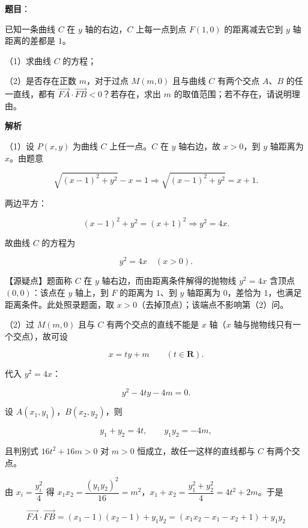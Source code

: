 \begin{answer}

\textbf{题目}：

已知一条曲线 $C$ 在 $y$ 轴的右边，$C$ 上每一点到点 $F(1,0)$ 的距离减去它到 $y$ 轴距离的差都是 $1$。

（1）求曲线 $C$ 的方程；

（2）是否存在正数 $m$，对于过点 $M(m,0)$ 且与曲线 $C$ 有两个交点 $A$、$B$ 的任一直线，都有 $\overrightarrow{FA}\cdot\overrightarrow{FB}<0$？若存在，求出 $m$ 的取值范围；若不存在，请说明理由。

\textbf{解析}

（1）设 $P(x,y)$ 为曲线 $C$ 上任一点。$C$ 在 $y$ 轴右边，故 $x>0$，到 $y$ 轴距离为 $x$。由题意

\nopagebreak[4]
\[\sqrt{(x-1)^2+y^2}-x=1
\Longrightarrow \sqrt{(x-1)^2+y^2}=x+1.\]

两边平方：

\nopagebreak[4]
\[(x-1)^2+y^2=(x+1)^2\Longrightarrow y^2=4x.\]

故曲线 $C$ 的方程为

\nopagebreak[4]
\[y^2=4x\quad(x>0).\]

【源疑点】题面称 $C$ 在 $y$ 轴右边，而由距离条件解得的抛物线 $y^2=4x$ 含顶点 $(0,0)$：该点在 $y$ 轴上，到 $F$ 的距离为 $1$、到 $y$ 轴距离为 $0$，差恰为 $1$，也满足距离条件。此处照录题面，取 $x>0$（去掉顶点）；该端点不影响第（2）问。

（2）过 $M(m,0)$ 且与 $C$ 有两个交点的直线不能是 $x$ 轴（$x$ 轴与抛物线只有一个交点），故可设

\nopagebreak[4]
\[x=ty+m\qquad(t\in\mathbf R).\]

代入 $y^2=4x$：

\nopagebreak[4]
\[y^2-4ty-4m=0.\]

设 $A(x_1,y_1)$，$B(x_2,y_2)$，则

\nopagebreak[4]
\[y_1+y_2=4t,\qquad y_1y_2=-4m,\]

且判别式 $16t^2+16m>0$ 对 $m>0$ 恒成立，故任一这样的直线都与 $C$ 有两个交点。

由 $x_i=\dfrac{y_i^2}{4}$ 得 $x_1x_2=\dfrac{(y_1y_2)^2}{16}=m^2$，$x_1+x_2=\dfrac{y_1^2+y_2^2}{4}=4t^2+2m$。于是

\nopagebreak[4]
\[\overrightarrow{FA}\cdot\overrightarrow{FB}=(x_1-1)(x_2-1)+y_1y_2
=\left(x_1x_2-x_1-x_2+1\right)+y_1y_2\]


\end{answer}
